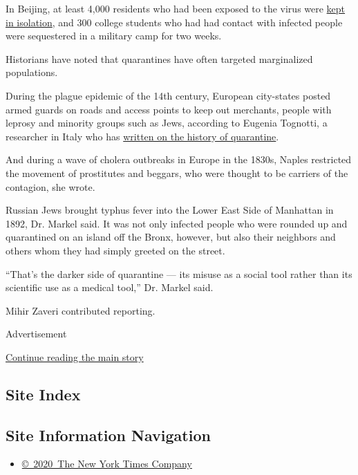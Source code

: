 In Beijing, at least 4,000 residents who had been exposed to the virus
were
\href{https://www.nytimes.com/2003/04/25/international/asia/4000-quarantined-in-beijing-as-suspected-sars-cases-climb.html}{kept
in isolation}, and 300 college students who had had contact with
infected people were sequestered in a military camp for two weeks.

Historians have noted that quarantines have often targeted marginalized
populations.

During the plague epidemic of the 14th century, European city-states
posted armed guards on roads and access points to keep out merchants,
people with leprosy and minority groups such as Jews, according to
Eugenia Tognotti, a researcher in Italy who has
\href{https://www.ncbi.nlm.nih.gov/pmc/articles/PMC3559034/pdf/12-0312.pdf}{written
on the history of quarantine}.

And during a wave of cholera outbreaks in Europe in the 1830s, Naples
restricted the movement of prostitutes and beggars, who were thought to
be carriers of the contagion, she wrote.

Russian Jews brought typhus fever into the Lower East Side of Manhattan
in 1892, Dr. Markel said. It was not only infected people who were
rounded up and quarantined on an island off the Bronx, however, but also
their neighbors and others whom they had simply greeted on the street.

``That's the darker side of quarantine --- its misuse as a social tool
rather than its scientific use as a medical tool,'' Dr. Markel said.

Mihir Zaveri contributed reporting.

Advertisement

\protect\hyperlink{after-bottom}{Continue reading the main story}

\hypertarget{site-index}{%
\subsection{Site Index}\label{site-index}}

\hypertarget{site-information-navigation}{%
\subsection{Site Information
Navigation}\label{site-information-navigation}}

\begin{itemize}
\tightlist
\item
  \href{https://help.nytimes.com/hc/en-us/articles/115014792127-Copyright-notice}{©~2020~The
  New York Times Company}
\end{itemize}

